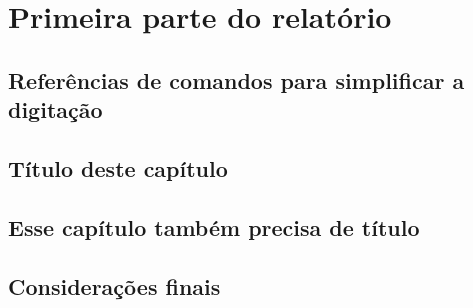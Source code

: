 \documentclass[pdftex,12pt,oneside,a4paper,english,french,spanish,brazil]{abntex2}
\begin{document}
\begin{sloppypar}
            \part{Primeira parte do relatório}\label{part:parte1}

            \chapter[Referências de comandos]{Referências de comandos para simplificar a digitação}\label{cap:refcomandos}
            

            \chapter{Título deste capítulo}\label{cap:capitulo1}
            

            \chapter{Esse capítulo também precisa de título}\label{cap:capitulo2}
            

            \chapter*[Considerações finais]{Considerações finais}\label{cap:consideracoesfinais}
            

            

          \pagestyle{modal}

            \cleardoublepage
            




\end{sloppypar}
\end{document}
